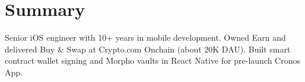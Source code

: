 \section{Summary}
Senior iOS engineer with 10+ years in mobile development. Owned Earn and delivered Buy \& Swap at Crypto.com Onchain (about 20K DAU). Built smart contract wallet signing and Morpho vaults in React Native for pre-launch Cronos App.
